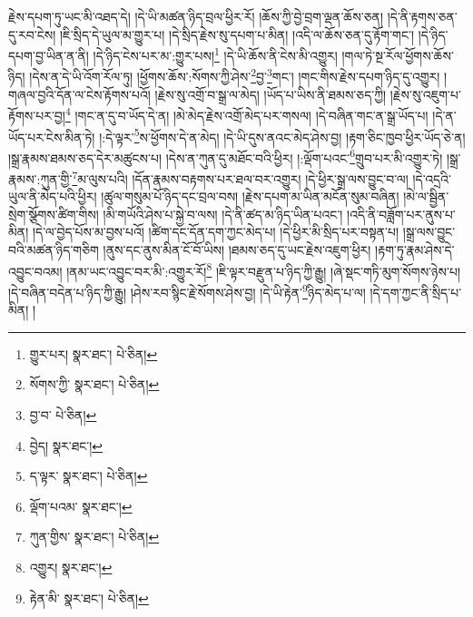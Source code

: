 རྗེས་དཔག་ཏུ་ཡང་མི་འཐད་དེ། །དེ་ཡི་མཚན་ཉིད་བྲལ་ཕྱིར་རོ། །ཆོས་ཀྱི་བྱེ་བྲག་ལྡན་ཆོས་ཅན། །དེ་ནི་རྟགས་ཅན་དུ་རབ་ངེས། །ཇི་སྲིད་དེ་ཡུལ་མ་གྱུར་པ། །དེ་སྲིད་རྗེས་སུ་དཔག་པ་མིན། །འདི་ལ་ཆོས་ཅན་དུ་རྟོག་གང་། །དེ་ཉིད་དཔག་བྱ་ཡིན་ན་ནི། །དེ་ཉིད་ངེས་པར་མ་:གྱུར་པས།\footnote{གྱུར་པར།  སྣར་ཐང་།  པེ་ཅིན། } །དེ་ཡི་ཆོས་ནི་ངེས་མི་འགྱུར། །གལ་ཏེ་སྔ་རོལ་ཕྱོགས་ཆོས་ཉིད། །དེས་ན་དེ་ཡི་འོག་རོལ་ཏུ། །ཕྱོགས་ཆོས་:སོགས་ཀྱི་ཤེས་\footnote{སོགས་ཀྱི་  སྣར་ཐང་།  པེ་ཅིན། }བྱ་\footnote{བྱ་བ་  པེ་ཅིན། }གང་། །གང་གིས་རྗེས་དཔག་ཉིད་དུ་འགྱུར། །གཞལ་བྱའི་དོན་ལ་ངེས་རྟོགས་པའོ། །རྗེས་སུ་འགྲོ་བ་སྒྲ་ལ་མེད། །ཡོད་པ་ཡིས་ནི་ཐམས་ཅད་ཀྱི། །རྗེས་སུ་འཇུག་པ་རྟོགས་པར་བྱ།\footnote{བྱེད།  སྣར་ཐང་། } །གང་ན་དུ་བ་ཡོད་དེ་ན། །མེ་མེད་རྗེས་འགྲོ་མེད་པར་གསལ། །དེ་བཞིན་གང་ན་སྒྲ་ཡོད་པ། །དེ་ན་ཡོད་པར་ངེས་མིན་ཏེ། །:དེ་ལྟར་\footnote{ད་ལྟར་  སྣར་ཐང་།  པེ་ཅིན། }ས་ཕྱོགས་དེ་ན་མེད། །དེ་ཡི་དུས་ནའང་མེད་ཤེས་བྱ། །རྟག་ཅིང་ཁྱབ་ཕྱིར་ཡོད་ཅེ་ན། །སྒྲ་རྣམས་ཐམས་ཅད་དེར་མཚུངས་པ། །དེས་ན་ཀུན་དུ་མཐོང་བའི་ཕྱིར། །:ལྡོག་པའང་\footnote{ལྡོག་པའམ་  སྣར་ཐང་། }གྲུབ་པར་མི་འགྱུར་ཏེ། །སྒྲ་རྣམས་:ཀུན་གྱི་\footnote{ཀུན་གྱིས་  སྣར་ཐང་།  པེ་ཅིན། }མ་ལུས་པའི། །དོན་རྣམས་བརྟགས་པར་ཐལ་བར་འགྱུར། །དེ་ཕྱིར་སྒྲ་ལས་བྱུང་བ་ལ། །དེ་འདྲའི་ཡུལ་ནི་མེད་པའི་ཕྱིར། །ཚུལ་གསུམ་པོ་ཉིད་དང་བྲལ་བས། །རྗེས་དཔག་མ་ཡིན་མངོན་སུམ་བཞིན། །མེ་ལ་སྦྱིན་སྲེག་སྩོགས་ཚིག་གིས། །མི་གཡོའི་ཤེས་པ་སྐྱེ་བ་ལས། །དེ་ནི་ཚད་མ་ཉིད་ཡིན་པའང་། །འདི་ནི་བཟློག་པར་ནུས་པ་མིན། །དེ་ལ་བྱེད་པོས་མ་བྱས་པའོ། །ཚིག་དང་དོན་དག་ཀྱང་མེད་པ། །དེ་ཕྱིར་མི་སྲིད་པར་བསྟན་པ། །སྒྲ་ལས་བྱུང་བའི་མཚན་ཉིད་གཅིག །ནུས་དང་ནུས་མིན་ངོ་བོ་ཡིས། །ཐམས་ཅད་དུ་ཡང་རྗེས་འཇུག་ཕྱིར། །རྟག་ཏུ་རྣམ་ཤེས་དེ་འབྱུང་བའམ། །ནམ་ཡང་འབྱུང་བར་མི་:འགྱུར་རོ།\footnote{འགྱུར།  སྣར་ཐང་། } །ཇི་ལྟར་བརྫུན་པ་ཉིད་ཀྱི་རྒྱུ། །ཞེ་སྡང་གཏི་མུག་སོགས་ཉེས་པ། །དེ་བཞིན་བདེན་པ་ཉིད་ཀྱི་རྒྱུ། །ཤེས་རབ་སྙིང་རྗེ་སོགས་ཤེས་བྱ། །དེ་ཡི་རྟེན་\footnote{རྟེན་མི་  སྣར་ཐང་།  པེ་ཅིན། }ཉིད་མེད་པ་ལ། །དེ་དག་ཀྱང་ནི་སྲིད་པ་མིན། །
